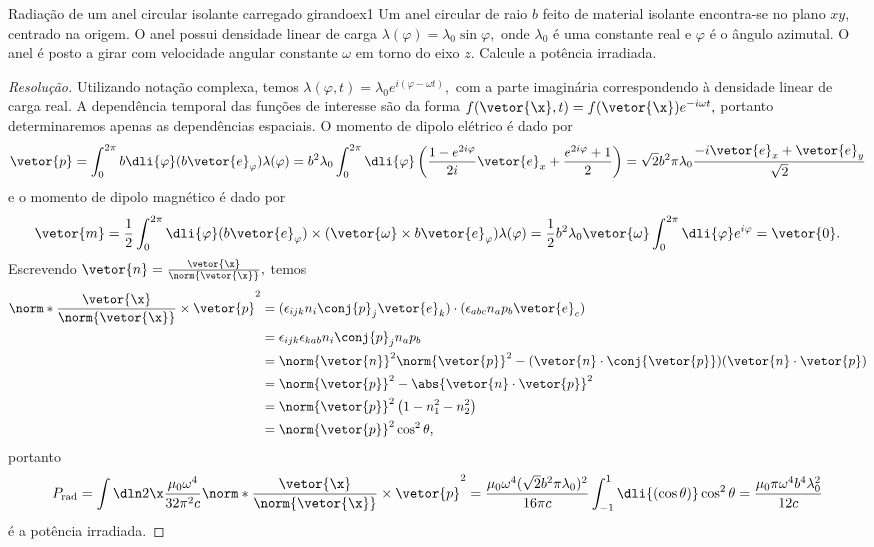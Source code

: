 \begin{exercício}{Radiação de um anel circular isolante carregado girando}{ex1}
    Um anel circular de raio \(b\) feito de material isolante encontra-se no plano \(xy\), centrado na origem. O anel possui densidade linear de carga \(\lambda(\varphi) = \lambda_0 \sin \varphi,\) onde \(\lambda_0\) é uma constante real e \(\varphi\) é o ângulo azimutal. O anel é posto a girar com velocidade angular constante \(\omega\) em torno do eixo \(z.\) Calcule a potência irradiada.
\end{exercício}
\begin{proof}[Resolução]
    Utilizando notação complexa, temos \(\lambda(\varphi, t) = \lambda_0 e^{i(\varphi - \omega t)},\) com a parte imaginária correspondendo à densidade linear de carga real. A dependência temporal das funções de interesse são da forma \(f(\vetor{\x}, t) = f(\vetor{\x}) e^{-i\omega t},\) portanto determinaremos apenas as dependências espaciais. O momento de dipolo elétrico é dado por
    \begin{equation*}
        \vetor{p} = \int_{0}^{2\pi} b \dli{\varphi} (b \vetor{e}_\varphi) \lambda(\varphi) = b^2 \lambda_0 \int_0^{2\pi} \dli{\varphi} \left(\frac{1 - e^{2i \varphi}}{2i}\vetor{e}_x + \frac{e^{2i\varphi} + 1}{2}\right) = \sqrt{2}b^2 \pi \lambda_0 \frac{-i\vetor{e}_x + \vetor{e}_y}{\sqrt{2}}
    \end{equation*}
    e o momento de dipolo magnético é dado por
    \begin{equation*}
        \vetor{m} = \frac12 \int_0^{2\pi} \dli{\varphi} (b\vetor{e}_\varphi) \times (\vetor{\omega} \times b \vetor{e}_\varphi) \lambda(\varphi) = \frac12 b^2\lambda_0\vetor{\omega} \int_0^{2\pi} \dli{\varphi}e^{i\varphi} = \vetor{0}.
    \end{equation*}
    Escrevendo \(\vetor{n} = \frac{\vetor{\x}}{\norm{\vetor{\x}}},\) temos
    \begin{align*}
        \norm*{\frac{\vetor{\x}}{\norm{\vetor{\x}}} \times \vetor{p}}^2 
        &= (\epsilon_{ijk} n_i \conj{p}_j \vetor{e}_k) \cdot (\epsilon_{abc} n_a p_b \vetor{e}_c)\\
        &= \epsilon_{ijk}\epsilon_{kab} n_i \conj{p}_j n_a p_b\\
        &= \norm{\vetor{n}}^2 \norm{\vetor{p}}^2 - (\vetor{n} \cdot \conj{\vetor{p}}) (\vetor{n} \cdot \vetor{p})\\
        &= \norm{\vetor{p}}^2 - \abs{\vetor{n} \cdot \vetor{p}}^2\\
        &= \norm{\vetor{p}}^2\left(1 - n_1^2 - n_2^2\right)\\
        &= \norm{\vetor{p}}^2 \cos^2\theta,
    \end{align*}
    portanto
    \begin{equation*}
        P_{\mathrm{rad}} = \int\dln2\x \frac{\mu_0 \omega^4}{32 \pi^2 c} \norm*{\frac{\vetor{\x}}{\norm{\vetor{\x}}} \times \vetor{p}}^2 = \frac{\mu_0 \omega^4(\sqrt{2}b^2 \pi \lambda_0)^2}{16\pi c} \int_{-1}^{1} \dli{(\cos\theta)} \cos^2\theta = \frac{\mu_0 \pi \omega^4 b^4 \lambda_0^2}{12 c}
    \end{equation*}
    é a potência irradiada.
\end{proof}
